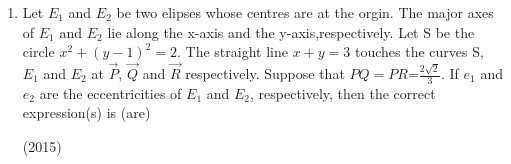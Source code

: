 \begin{enumerate}[label=\thesubsection.\arabic*.,ref=\thesubsection.\theenumi]
		 \begin{multicols}{4}
\begin{enumerate}
			\item$\frac{-1}{r}$
			\item$\frac{1}{r}$
			\item$\frac{2}{r}$
			\item$\frac{2}{r}$
	        \end{enumerate}
\end{multicols}
	\item Let $ E_1$  and $ E_2$ be two elipses whose centres are at the orgin.
              The major axes of $E_1$ and $ E_2$ lie along the x-axis and the
              y-axis,respectively. Let S be the circle $x^2+(y-1)^2=2$. The
		straight line $x+y=3$ touches the curves S, $E_1$ and $E_2$ at $\vec{P}$, $\vec{Q}$
		and $\vec{R}$ respectively. Suppose that $PQ=PR$=$\frac{2\sqrt{2}}{3}$. If $e_1$ and
              $e_2$ are the eccentricities of $E_1$ and $E_2$, respectively, then the 
              correct expression(s) is (are) 
	        
		\hfill(2015)
		

\end{enumerate}
